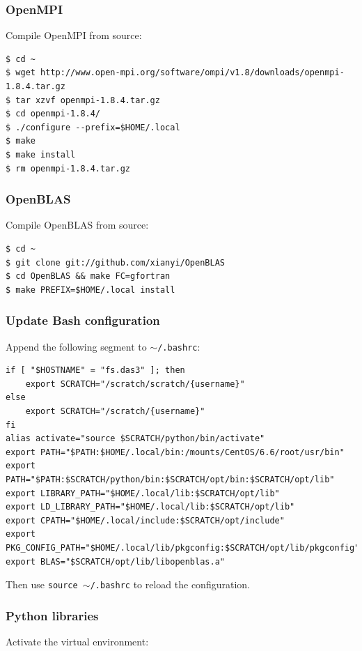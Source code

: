 \documentclass{article}
\begin{document}
\subsubsection{OpenMPI}\label{app:openmpi}
Compile OpenMPI from source:

\begin{verbatim}
$ cd ~
$ wget http://www.open-mpi.org/software/ompi/v1.8/downloads/openmpi-1.8.4.tar.gz
$ tar xzvf openmpi-1.8.4.tar.gz
$ cd openmpi-1.8.4/
$ ./configure --prefix=$HOME/.local
$ make
$ make install
$ rm openmpi-1.8.4.tar.gz
\end{verbatim}

\subsubsection{OpenBLAS}\label{app:openblas}
Compile OpenBLAS from source:

\begin{verbatim}
$ cd ~
$ git clone git://github.com/xianyi/OpenBLAS
$ cd OpenBLAS && make FC=gfortran
$ make PREFIX=$HOME/.local install
\end{verbatim}

\subsubsection{Update Bash configuration}\label{app:update-bashrc}
Append the following segment to \texttt{$\sim$/.bashrc}:

\begin{verbatim}
if [ "$HOSTNAME" = "fs.das3" ]; then
    export SCRATCH="/scratch/scratch/{username}"
else
    export SCRATCH="/scratch/{username}"
fi
alias activate="source $SCRATCH/python/bin/activate"
export PATH="$PATH:$HOME/.local/bin:/mounts/CentOS/6.6/root/usr/bin"
export PATH="$PATH:$SCRATCH/python/bin:$SCRATCH/opt/bin:$SCRATCH/opt/lib"
export LIBRARY_PATH="$HOME/.local/lib:$SCRATCH/opt/lib"
export LD_LIBRARY_PATH="$HOME/.local/lib:$SCRATCH/opt/lib"
export CPATH="$HOME/.local/include:$SCRATCH/opt/include"
export PKG_CONFIG_PATH="$HOME/.local/lib/pkgconfig:$SCRATCH/opt/lib/pkgconfig"
export BLAS="$SCRATCH/opt/lib/libopenblas.a"
\end{verbatim}

Then use \texttt{source $\sim$/.bashrc} to reload the configuration.

\subsubsection{Python libraries}\label{app:python-libraries}
Activate the virtual environment:
\end{document}
